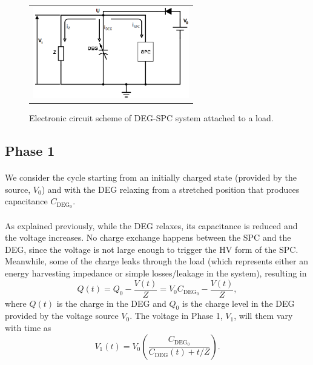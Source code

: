 \begin{figure}[ht]
\begin{center}
\begin{tabular}{c}
\includegraphics[height=4cm]{fig03/schemeit-project3.png}\\
\end{tabular}
\end{center}
\caption 
{ \label{fig:circuit}
Electronic circuit scheme of DEG-SPC system attached to a load.} 
\end{figure}

\subsection{Phase 1}

\paragraph{}  We consider the cycle starting from an initially charged state (provided by the source, $V_0$) and with the DEG relaxing from a stretched position that produces capacitance $C_{\text{DEG}_0}$.

\paragraph{} As explained previously, while the DEG relaxes, its capacitance is reduced and the voltage increases. No charge exchange happens between the SPC and the DEG, since the voltage is not large enough to trigger the HV form of the SPC. Meanwhile, some of the charge leaks  through the load (which represents either an energy harvesting impedance or simple losses/leakage in the system), resulting in
\begin{equation}
Q(t) = Q_0-\frac{V(t)}{Z} = V_0C_{\text{DEG}_0}-\frac{V(t)}{Z},
\end{equation}
where $Q(t)$ is the charge in the DEG and $Q_0$ is the charge level in the DEG provided by the voltage source $V_0$.  The voltage in Phase 1, $V_1$, will them vary with time as
\begin{equation}\label{eq:v1t}
V_{1}(t) = V_0\left(\frac{C_{\text{DEG}_0}}{C_\text{DEG}(t)+t/Z}\right).
\end{equation}


